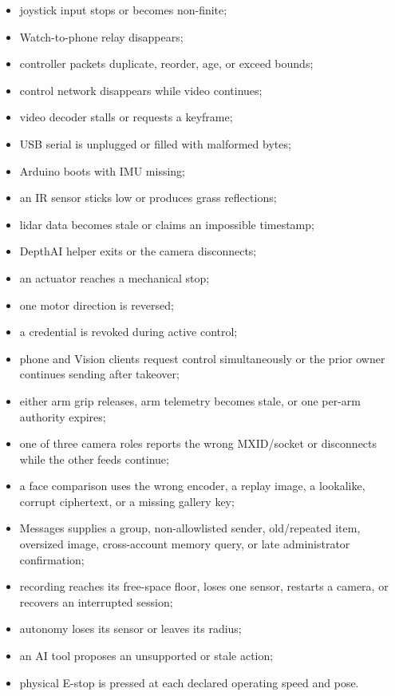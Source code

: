 \documentclass[10pt,openany]{book}
\begin{document}
\begin{itemize}
  \item joystick input stops or becomes non-finite;
  \item Watch-to-phone relay disappears;
  \item controller packets duplicate, reorder, age, or exceed bounds;
  \item control network disappears while video continues;
  \item video decoder stalls or requests a keyframe;
  \item USB serial is unplugged or filled with malformed bytes;
  \item Arduino boots with IMU missing;
  \item an IR sensor sticks low or produces grass reflections;
  \item lidar data becomes stale or claims an impossible timestamp;
  \item DepthAI helper exits or the camera disconnects;
  \item an actuator reaches a mechanical stop;
  \item one motor direction is reversed;
  \item a credential is revoked during active control;
  \item phone and Vision clients request control simultaneously or the prior owner continues sending after takeover;
  \item either arm grip releases, arm telemetry becomes stale, or one per-arm authority expires;
  \item one of three camera roles reports the wrong MXID/socket or disconnects while the other feeds continue;
  \item a face comparison uses the wrong encoder, a replay image, a lookalike, corrupt ciphertext, or a missing gallery key;
  \item Messages supplies a group, non-allowlisted sender, old/repeated item, oversized image, cross-account memory query, or late administrator confirmation;
  \item recording reaches its free-space floor, loses one sensor, restarts a camera, or recovers an interrupted session;
  \item autonomy loses its sensor or leaves its radius;
  \item an AI tool proposes an unsupported or stale action;
  \item physical E-stop is pressed at each declared operating speed and pose.
\end{itemize}
\end{document}
